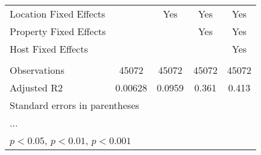 \begin{table}[htbp]
\begin{tabular}{l*{4}{c}}
\hline
Location Fixed Effects&                     &         Yes         &         Yes         &         Yes         \\
Property Fixed Effects&                     &                     &         Yes         &         Yes         \\
Host Fixed Effects  &                     &                     &                     &         Yes         \\
\hline \vspace{-1.25em}&                     &                     &                     &                     \\
Observations        &       45072         &       45072         &       45072         &       45072         \\
Adjusted R2         &     0.00628         &      0.0959         &       0.361         &       0.413         \\
\hline\hline
\multicolumn{5}{l}{\footnotesize Standard errors in parentheses}\\
\multicolumn{5}{l}{\footnotesize ...}\\
\multicolumn{5}{l}{\footnotesize \sym{*} \(p<0.05\), \sym{**} \(p<0.01\), \sym{***} \(p<0.001\)}\\
\end{tabular}
\end{table}
